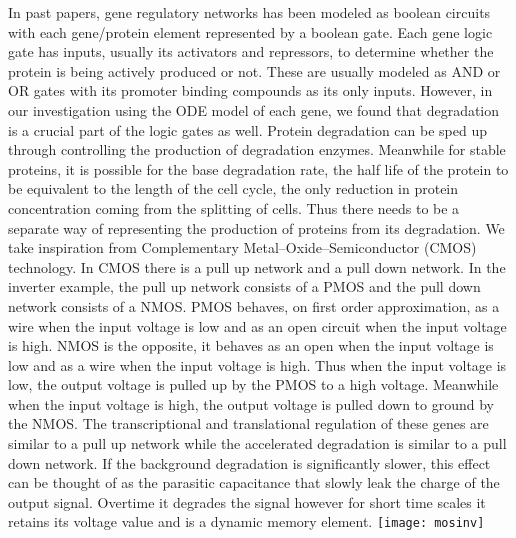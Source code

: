 \documentclass{article}
\begin{document}
In past papers, gene regulatory networks has been modeled as boolean circuits with each gene/protein element represented by a boolean gate.  Each gene logic gate has inputs, usually its activators and repressors, to determine whether the protein is being actively produced or not.  These are usually modeled as AND or OR gates with its promoter binding compounds as its only inputs.  However, in our investigation using the ODE model of each gene, we found that degradation is a crucial part of the logic gates as well.  Protein degradation can be sped up through controlling the production of degradation enzymes.  Meanwhile for stable proteins, it is possible for the base degradation rate, the half life of the protein to be equivalent to the length of the cell cycle, the only reduction in protein concentration coming from the splitting of cells.  Thus there needs to be a separate way of representing the production of proteins from its degradation.  We take inspiration from Complementary Metal–Oxide–Semiconductor (CMOS) technology.  In CMOS there is a pull up network and a pull down network.  In the inverter example, the pull up network consists of a PMOS and the pull down network consists of a NMOS.  PMOS behaves, on first order approximation, as a wire when the input voltage is low and as an open circuit when the input voltage is high.  NMOS is the opposite, it behaves as an open when the input voltage is low and as a wire when the input voltage is high.  Thus when the input voltage is low, the output voltage is pulled up by the PMOS to a high voltage.  Meanwhile when the input voltage is high, the output voltage is pulled down to ground by the NMOS.  The transcriptional and translational regulation of these genes are similar to a pull up network while the accelerated degradation is similar to a pull down network.  If the background degradation is significantly slower, this effect can be thought of as the parasitic capacitance that slowly leak the charge of the output signal.  Overtime it degrades the signal however for short time scales it retains its voltage value and is a dynamic memory element.
\newline
\texttt{[image: mosinv]}
\newline \newline
\end{document}
